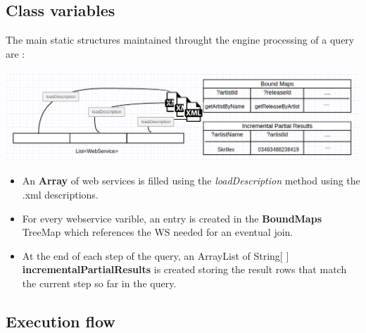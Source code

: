\documentclass[11pt]{article}
\begin{document}
\subsection{Class variables}
The main static structures maintained throught the engine processing of a query are :
\begin{center}
\includegraphics[width=\linewidth]{static.png}
\end{center}
\begin{itemize}
\item An \textbf{Array} of web services is filled using the \textit{loadDescription} method using the .xml descriptions.
\item For every webservice varible, an entry is created in the \textbf{BoundMaps} TreeMap which references the WS needed for an eventual join.
\item At the end of each step of the query, an ArrayList of String[ ] \textbf{incrementalPartialResults} is created storing the result rows that match the current step so far in the query.
\end{itemize}
\subsection{Execution flow}
\end{document}
